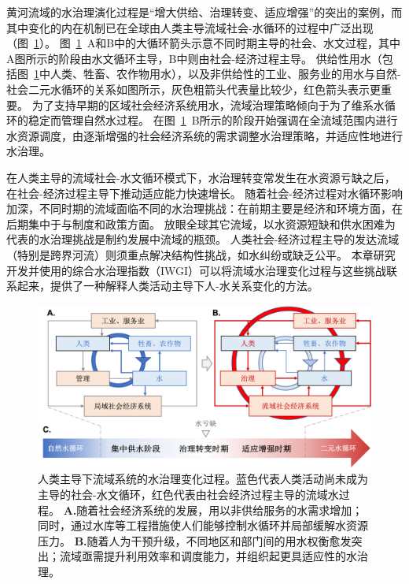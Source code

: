 黄河流域的水治理演化过程是“增大供给、治理转变、适应增强”的突出的案例，而其中变化的内在机制已在全球由人类主导流域社会-水循环的过程中广泛出现（图~\ref{fig:summary}）。
图~\ref{fig:summary}~A和B中的大循环箭头示意不同时期主导的社会、水文过程，其中A图所示的阶段由水文循环主导，B中则由社会-经济过程主导。
供给性用水（包括图~\ref{fig:summary}中人类、牲畜、农作物用水），以及非供给性的工业、服务业的用水与自然-社会二元水循环的关系如图所示，灰色粗箭头代表量比较少，红色箭头表示更重要。
为了支持早期的区域社会经济系统用水，流域治理策略倾向于为了维系水循环的稳定而管理自然水过程。
在图~\ref{fig:summary}~B所示的阶段开始强调在全流域范围内进行水资源调度，由逐渐增强的社会经济系统的需求调整水治理策略，并适应性地进行水治理。

在人类主导的流域社会-水文循环模式下，水治理转变常发生在水资源亏缺之后，在社会-经济过程主导下推动适应能力快速增长。
随着社会-经济过程对水循环影响加深，不同时期的流域面临不同的水治理挑战：在前期主要是经济和环境方面，在后期集中于与制度和政策方面。
放眼全球其它流域，以水资源短缺和供水困难为代表的水治理挑战是制约发展中流域的瓶颈\cite{allan2019,speed2013,liu2012a}。
人类社会-经济过程主导的发达流域（特别是跨界河流）则须重点解决结构性挑战，如水纠纷或缺乏公平\cite{mirumachi2015}。
本章研究开发并使用的综合水治理指数（IWGI）可以将流域水治理变化过程与这些挑战联系起来，提供了一种解释人类活动主导下人-水关系变化的方法。

\begin{figure}[!htbp]
	\includegraphics[width=\textwidth]{img/ch4/ch4_transition.png}
	\caption[人类主导下流域系统的水治理阶段过渡]{
		人类主导下流域系统的水治理变化过程。蓝色代表人类活动尚未成为主导的社会-水文循环，红色代表由社会经济过程主导的流域水过程。
        \textbf{A.}随着社会经济系统的发展，用以非供给服务的水需求增加；同时，通过水库等工程措施使人们能够控制水循环并局部缓解水资源压力。
        \textbf{B.}随着人为干预升级，不同地区和部门间的用水权衡愈发突出；流域亟需提升利用效率和调度能力，并组织起更具适应性的水治理。
	}\label{fig:summary}
\end{figure}

